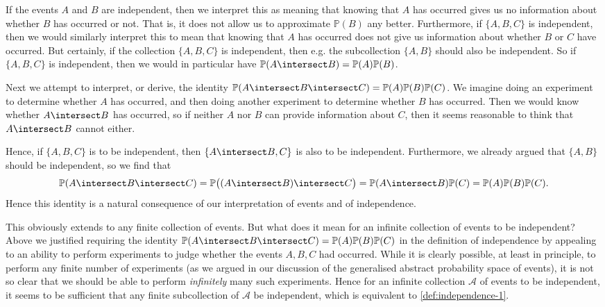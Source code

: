 \documentclass[article, a4paper, 11pt, oneside]{memoir}
\numberwithin{equation}{chapter}
\newcommand{\calA}{\mathcal{A}}
\renewcommand{\P}{\mathbb{P}}
\begin{document}
If the events $A$ and $B$ are independent, then we interpret this as meaning that knowing that $A$ has occurred gives us no information about whether $B$ has occurred or not. That is, it does not allow us to approximate $\P(B)$ any better. Furthermore, if $\{A,B,C\}$ is independent, then we would similarly interpret this to mean that knowing that $A$ has occurred does not give us information about whether $B$ or $C$ have occurred. But certainly, if the collection $\{A,B,C\}$ is independent, then e.g. the subcollection $\{A,B\}$ should also be independent. So if $\{A,B,C\}$ is independent, then we would in particular have $\P(A \intersect B) = \P(A) \P(B)$.

Next we attempt to interpret, or derive, the identity $\P(A \intersect B \intersect C) = \P(A) \P(B) \P(C)$. We imagine doing an experiment to determine whether $A$ has occurred, and then doing another experiment to determine whether $B$ has occurred. Then we would know whether $A \intersect B$ has occurred, so if neither $A$ nor $B$ can provide information about $C$, then it seems reasonable to think that $A \intersect B$ cannot either.

Hence, if $\{A,B,C\}$ is to be independent, then $\{A \intersect B, C\}$ is also to be independent. Furthermore, we already argued that $\{A,B\}$ should be independent, so we find that
%
\begin{equation*}
    \P(A \intersect B \intersect C)
        = \P \bigl( (A \intersect B) \intersect C \bigr)
        = \P(A \intersect B) \P(C)
        = \P(A) \P(B) \P(C).
\end{equation*}
%
Hence this identity is a natural consequence of our interpretation of events and of independence.

This obviously extends to any finite collection of events. But what does it mean for an infinite collection of events to be independent? Above we justified requiring the identity $\P(A \intersect B \intersect C) = \P(A) \P(B) \P(C)$ in the definition of independence by appealing to an ability to perform experiments to judge whether the events $A,B,C$ had occurred. While it is clearly possible, at least in principle, to perform any finite number of experiments (as we argued in our discussion of the generalised abstract probability space of events), it is not so clear that we should be able to perform \emph{infinitely} many such experiments. Hence for an infinite collection $\calA$ of events to be independent, it seems to be sufficient that any finite subcollection of $\calA$ be independent, which is equivalent to \cref{def:independence-1}.
\end{document}
